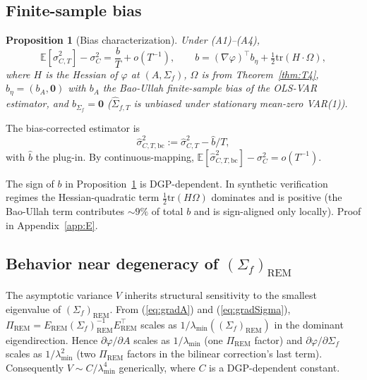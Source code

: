 \documentclass[11pt,letterpaper]{article}
\newtheorem{proposition}{Proposition}
\theoremstyle{remark}
\newcommand{\REM}{\mathrm{REM}}
\newcommand{\PiREM}{\Pi_{\REM}}
\newcommand{\trace}{\mathrm{tr}}
\newcommand{\E}{\mathbb{E}}
\begin{document}
\subsection{Finite-sample bias}\label{sec:bias}

\begin{proposition}[Bias characterization]\label{prop:P6}
Under (A1)--(A4),
\begin{equation*}
\E[\widehat{\sigma}^2_{C, T}] - \sigma^2_C = \frac{b}{T} + o(T^{-1}), \qquad b = (\nabla \varphi)^\top b_\eta + \tfrac{1}{2} \trace(H \cdot \Omega),
\end{equation*}
where $H$ is the Hessian of $\varphi$ at $(A, \Sigma_f)$, $\Omega$ is from Theorem~\ref{thm:T4}, $b_\eta = (b_A, \mathbf{0})$ with $b_A$ the Bao-Ullah \cite{BaoUllah2002} finite-sample bias of the OLS-VAR estimator, and $b_{\Sigma_f} = \mathbf{0}$ ($\widehat{\Sigma}_{f, T}$ is unbiased under stationary mean-zero VAR(1)).
\end{proposition}

The bias-corrected estimator is
\begin{equation*}
\widehat{\sigma}^2_{C, T, \mathrm{bc}} := \widehat{\sigma}^2_{C, T} - \widehat{b}/T,
\end{equation*}
with $\widehat{b}$ the plug-in. By continuous-mapping, $\E[\widehat{\sigma}^2_{C, T, \mathrm{bc}}] - \sigma^2_C = o(T^{-1})$.

The sign of $b$ in Proposition~\ref{prop:P6} is DGP-dependent. In synthetic verification regimes the Hessian-quadratic term $\tfrac{1}{2} \trace(H\Omega)$ dominates and is positive (the Bao-Ullah term contributes $\sim 9\%$ of total $b$ and is sign-aligned only locally). Proof in Appendix~\ref{app:E}.

\subsection{\texorpdfstring{Behavior near degeneracy of $(\Sigma_f)_\REM$}{Behavior near degeneracy of (Sigma\_f)\_REM}}\label{sec:near-deg}

The asymptotic variance $V$ inherits structural sensitivity to the smallest eigenvalue of $(\Sigma_f)_\REM$. From (\ref{eq:gradA}) and (\ref{eq:gradSigma}), $\PiREM = E_\REM (\Sigma_f)_\REM^{-1} E_\REM^\top$ scales as $1/\lambda_{\min}((\Sigma_f)_\REM)$ in the dominant eigendirection. Hence $\partial \varphi / \partial A$ scales as $1/\lambda_{\min}$ (one $\PiREM$ factor) and $\partial \varphi / \partial \Sigma_f$ scales as $1/\lambda_{\min}^2$ (two $\PiREM$ factors in the bilinear correction's last term). Consequently $V \sim C / \lambda_{\min}^4$ generically, where $C$ is a DGP-dependent constant.
\end{document}

